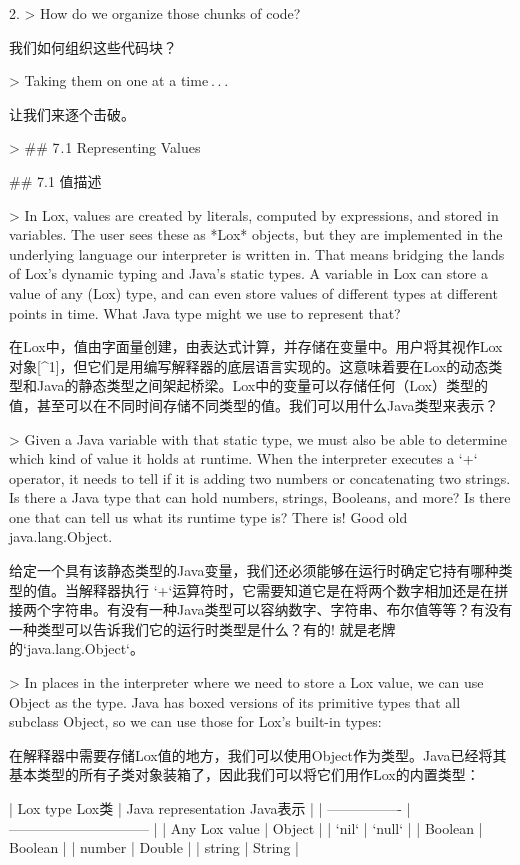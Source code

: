 \documentclass[cn,11pt,chinese]{elegantbook}
\begin{document}
2. > How do we organize those chunks of code?

   我们如何组织这些代码块？

> Taking them on one at a time . . . 

让我们来逐个击破。

> ## 7 . 1 Representing Values

## 7.1 值描述

> In Lox, values are created by literals, computed by expressions, and stored in variables. The user sees these as *Lox* objects, but they are implemented in the underlying language our interpreter is written in. That means bridging the lands of Lox’s dynamic typing and Java’s static types. A variable in Lox can store a value of any (Lox) type, and can even store values of different types at different points in time. What Java type might we use to represent that?

在Lox中，值由字面量创建，由表达式计算，并存储在变量中。用户将其视作Lox对象[^1]，但它们是用编写解释器的底层语言实现的。这意味着要在Lox的动态类型和Java的静态类型之间架起桥梁。Lox中的变量可以存储任何（Lox）类型的值，甚至可以在不同时间存储不同类型的值。我们可以用什么Java类型来表示？

> Given a Java variable with that static type, we must also be able to determine which kind of value it holds at runtime. When the interpreter executes a `+` operator, it needs to tell if it is adding two numbers or concatenating two strings. Is there a Java type that can hold numbers, strings, Booleans, and more? Is there one that can tell us what its runtime type is? There is! Good old java.lang.Object.

给定一个具有该静态类型的Java变量，我们还必须能够在运行时确定它持有哪种类型的值。当解释器执行 `+`运算符时，它需要知道它是在将两个数字相加还是在拼接两个字符串。有没有一种Java类型可以容纳数字、字符串、布尔值等等？有没有一种类型可以告诉我们它的运行时类型是什么？有的! 就是老牌的`java.lang.Object`。

> In places in the interpreter where we need to store a Lox value, we can use Object as the type. Java has boxed versions of its primitive types that all subclass Object, so we can use those for Lox’s built-in types:

在解释器中需要存储Lox值的地方，我们可以使用Object作为类型。Java已经将其基本类型的所有子类对象装箱了，因此我们可以将它们用作Lox的内置类型：

| Lox type   Lox类 | Java representation   Java表示 |
| ---------------- | ------------------------------ |
| Any Lox value    | Object                         |
| `nil`            | `null`                         |
| Boolean          | Boolean                        |
| number           | Double                         |
| string           | String                         |
\end{document}
